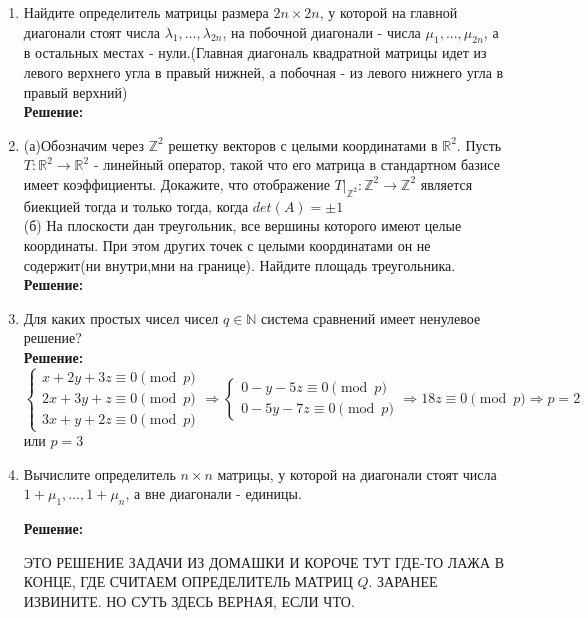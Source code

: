 \documentclass[]{book}
\theoremstyle{definition}
\newcommand{\bb}[1]{\mathbb{#1}}
\begin{document}
\begin{enumerate}[resume]
\item Найдите определитель матрицы размера $2n\times2n$, у которой на главной диагонали стоят числа $\lambda_1,...,\lambda_{2n}$, на побочной диагонали - числа $\mu_1,...,\mu_{2n}$, а в остальных местах - нули.(Главная диагональ квадратной матрицы идет из левого верхнего угла в правый нижней, а побочная - из левого нижнего угла в правый верхний)\\
\textbf{Решение:}\\



\item
(а)Обозначим через $\bb{Z}^2$ решетку векторов с целыми координатами в $\bb{R}^2$. Пусть $T: \bb{R}^2 \rightarrow \bb{R}^2$ - линейный оператор, такой что его матрица в стандартном базисе имеет коэффициенты. Докажите, что отображение $T|_{\bb{Z}^2}: \bb{Z}^2 \rightarrow \bb{Z}^2$ является биекцией тогда и только тогда, когда $det(A) = \pm 1$\\
(б) На плоскости дан треугольник, все вершины которого имеют целые координаты. При этом других точек с целыми координатами он не содержит(ни внутри,мни на границе). Найдите площадь треугольника.\\
\textbf{Решение:}\\

\item Для каких простых чисел чисел $q\in \bb{N}$ система сравнений имеет ненулевое решение?\\
\textbf{Решение:}\\
$\begin{cases} 
   x+2y+3z \equiv 0 \pmod{p} \\
   2x+3y+z \equiv 0 \pmod{p}\\
   3x+y+2z \equiv 0 \pmod{p}
\end{cases} \Rightarrow
\begin{cases} 
   0-y-5z \equiv 0 \pmod{p} \\
  0-5y-7z \equiv 0 \pmod{p}
\end{cases} \Rightarrow
18z \equiv 0 \pmod{p} \Rightarrow p=2$ или $p=3$


\item Вычислите определитель $n\times n$ матрицы, у которой на диагонали стоят числа $1+\mu_1,..., 1+\mu_n$, а вне диагонали - единицы.

\textbf{Решение:}

ЭТО РЕШЕНИЕ ЗАДАЧИ ИЗ ДОМАШКИ И КОРОЧЕ ТУТ ГДЕ-ТО ЛАЖА В КОНЦЕ, ГДЕ СЧИТАЕМ ОПРЕДЕЛИТЕЛЬ МАТРИЦ $Q$. ЗАРАНЕЕ ИЗВИНИТЕ. НО СУТЬ ЗДЕСЬ ВЕРНАЯ, ЕСЛИ ЧТО.


\end{enumerate}
\end{document}
